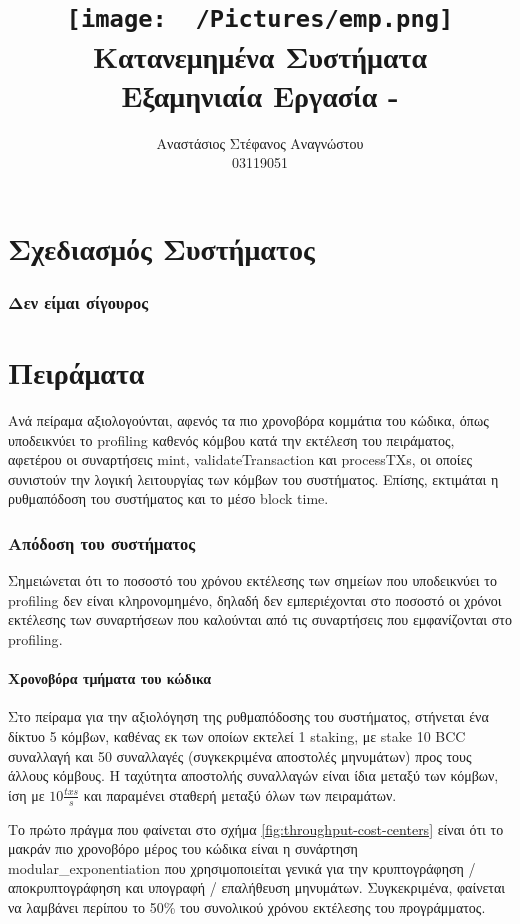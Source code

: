 \documentclass{article}
\title{
    \texttt{[image: ~/Pictures/emp.png]} \\
    \vskip 5cm
    Κατανεμημένα Συστήματα \\
    \large Εξαμηνιαία Εργασία - \eng{BlockChat} 
    \vskip 5cm
}
\author{ Αναστάσιος Στέφανος Αναγνώστου \\ \large 03119051 }
\newcommand{\eng}[1]{\foreignlanguage{english}{#1}} %
\begin{document}
\maketitle \clearpage \tableofcontents \clearpage

\part{Σχεδιασμός Συστήματος}

\section{Δεν είμαι σίγουρος}

\clearpage
\part{Πειράματα}

Ανά πείραμα αξιολογούνται, αφενός τα πιο χρονοβόρα κομμάτια του κώδικα, όπως
υποδεικνύει το \eng{profiling} καθενός κόμβου κατά την εκτέλεση του πειράματος,
αφετέρου οι συναρτήσεις \eng{mint}, \eng{validateTransaction} και
\eng{processTXs}, οι οποίες συνιστούν την λογική λειτουργίας των κόμβων του
συστήματος. Επίσης, εκτιμάται η ρυθμαπόδοση του συστήματος και το μέσο
\eng{block time}.

\section{Απόδοση του συστήματος}

Σημειώνεται ότι το ποσοστό του χρόνου εκτέλεσης των σημείων που υποδεικνύει το
\eng{profiling} δεν είναι κληρονομημένο, δηλαδή δεν εμπεριέχονται στο ποσοστό
οι χρόνοι εκτέλεσης των συναρτήσεων που καλούνται από τις συναρτήσεις που
εμφανίζονται στο \eng{profiling}.

\subsection{Χρονοβόρα τμήματα του κώδικα}

Στο πείραμα για την αξιολόγηση της ρυθμαπόδοσης του συστήματος, στήνεται ένα
δίκτυο 5 κόμβων, καθένας εκ των οποίων εκτελεί 1 \eng{staking}, με \eng{stake
10 BCC} συναλλαγή και 50 συναλλαγές (συγκεκριμένα αποστολές μηνυμάτων) προς
τους άλλους κόμβους. Η ταχύτητα αποστολής συναλλαγών είναι ίδια μεταξύ των
κόμβων, ίση με $10\frac{txs}{s}$ και παραμένει σταθερή μεταξύ όλων των
πειραμάτων.

Το πρώτο πράγμα που φαίνεται στο σχήμα \ref{fig:throughput-cost-centers} είναι
ότι το μακράν πιο χρονοβόρο μέρος του κώδικα είναι η συνάρτηση
\eng{modular\_exponentiation} που χρησιμοποιείται γενικά για την κρυπτογράφηση
/ αποκρυπτογράφηση και υπογραφή / επαλήθευση μηνυμάτων. Συγκεκριμένα, φαίνεται
να λαμβάνει περίπου το 50\% του συνολικού χρόνου εκτέλεσης του προγράμματος.
\end{document}
